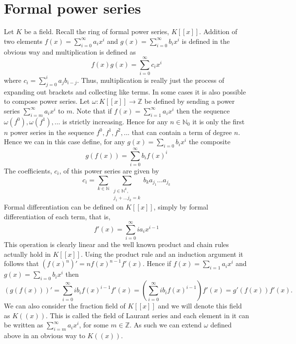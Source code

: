 \documentclass{article}
\newcommand{\mbb}[1]{\mathbb{#1}}
\begin{document}
\section{Formal power series}

Let $K$ be a field. Recall the ring of formal power series, $K[[x]]$. Addition of two elements $f(x) = \sum_{i = 0}^\infty a_ix^i$ and $g(x) = \sum_{i = 0}^\infty b_ix^i$ is defined in the obvious way and multiplication is defined as
$$f(x)g(x) = \sum_{i = 0}^{\infty}c_i x^i$$
where $c_i = \sum_{j = 0}^i a_j b_{i-j}$. Thus, multiplication is really just the process of expanding out brackets and collecting like terms. In some cases it is also possible to compose power series. Let $\omega : K[[x]] \to \mbb Z$ be defined by sending a power series $\sum_{i = m}^\infty a_i x^i$ to $m$. Note that if $f(x) = \sum_{i = 1}^\infty a_ix^i$ then the sequence $\omega(f^0), \omega(f^1), ...$ is strictly increasing. Hence for any $n \in \mbb N_0$ it is only the first $n$ power series in the sequence $f^0, f^1, f^2, ...$ that can contain a term of degree $n$. Hence we can in this case define, for any $g(x) = \sum_{i = 0} b_i x^i$ the composite
$$g(f(x)) = \sum_{i = 0}^\infty b_i f(x)^i$$
The coefficients, $c_i$, of this power series are given by 
$$c_i = \sum_{k \in \mbb N} \sum_{\substack{j \in \mbb N^k, \\ j_1 + ... j_k = k}} b_k a_{j_1}...a_{j_k} $$
Formal differentiation can be defined on $K[[x]]$, simply by formal differentiation of each term, that is, 
$$f'(x) = \sum_{i = 0}^\infty i a_{i} x^{i-1}$$
This operation is clearly linear and the well known product and chain rules actually hold in $K[[x]]$. Using the product rule and an induction argument it follows that $(f(x)^n)' = n f(x)^{n-1}f'(x)$. Hence if $f(x) = \sum_{i = 1} a_i x^i$ and $g(x) = \sum_{i = 0} b_i x^i$ then
$$(g(f(x)))' = \sum_{i = 0}^\infty ib_i f(x)^{i-1}f'(x) = (\sum_{i = 0}^\infty i b_i f(x)^{i-1})f'(x) = g'(f(x))f'(x).$$ 
We can also consider the fraction field of $K[[x]]$ and we will denote this field as $K((x))$. This is called the field of Laurant series and each element in it can be written as $\sum_{i = m}^\infty a_i x^i$, for some $m \in \mbb Z$. As such we can extend $\omega$ defined above in an obvious way to $K((x))$. 
\end{document}
